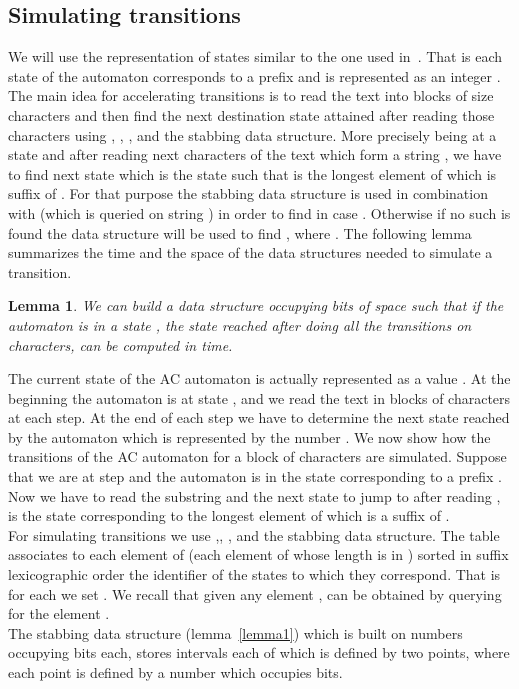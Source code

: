 \documentclass{article}
\newcommand{\?}{\mskip1.5mu}
\newtheorem{lemma}{Lemma}
\begin{document}
\subsection{Simulating transitions}
\label{subsec:simul_trans}
We will use the representation of states similar to the one used in~\cite{B10a}. That is each state of the automaton corresponds to a prefix  and is represented as an integer . The main idea for accelerating transitions is to read the text into blocks of size  characters and then find the next destination state attained after reading those  characters using , , ,  and the  stabbing data structure. More precisely being at a state  and after reading next  characters of the text which form a string , we have to find next state which is the state  such that  is the longest element of  which is suffix of . For that purpose the  stabbing data structure is used in combination with  (which is queried on string ) in order to find  in case . Otherwise if no such  is found the data structure  will be used to find , where . 
The following lemma summarizes the time and the space of the data structures needed to simulate a transition.  
\begin{lemma}
\label{lemma:trans_lemma}
We can build a data structure occupying  bits of space such that if the automaton is in a state , the state  reached after doing all the transitions on  characters, can be computed in  time. 
\end{lemma}
The current state of the AC automaton is actually represented as a value . At the beginning the automaton is at state , and we read the text in blocks of  characters at each step. At the end of each step we have to determine the next state reached by the automaton which is represented by the number . We now show how the transitions of the AC automaton for a block of  characters are simulated. Suppose that we are at step  and the automaton is in the state  corresponding to a prefix . Now we have to read the substring  
and the next state to jump to after reading , is the state  corresponding to the longest element  of  which is a suffix of . 
\\
For simulating transitions we use ,, ,  and the  stabbing data structure. The table  associates to each element of  (each element of  whose length is in ) sorted in suffix lexicographic order the identifier of the states to which they correspond. That is for each  we set . We recall that given any element ,  can be obtained by querying  for the element .  
\\
The  stabbing data structure (lemma~\ref{lemma1}) which is built on numbers occupying  bits each, stores  intervals each of which is defined by two points, where each point is defined by a number which occupies  bits. 
\end{document}
